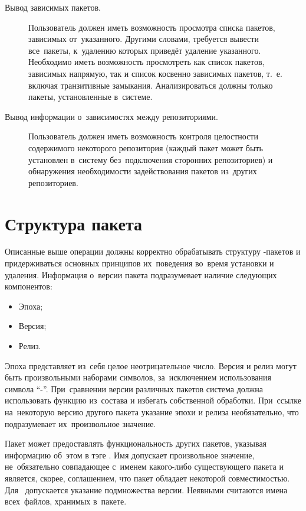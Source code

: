 \begin{description}
\item[Вывод зависимых пакетов.]
Пользователь должен иметь возможность просмотра списка пакетов, зависимых от~указанного.
Другими словами, требуется вывести все~пакеты, к~удалению которых приведёт удаление указанного.
Необходимо иметь возможность просмотреть как список пакетов, зависимых напрямую, 
так и список косвенно зависимых пакетов, т.~е. включая транзитивные замыкания.
Анализироваться должны только пакеты, установленные в~системе.

\item[Вывод информации о~зависимостях между репозиториями.]
Пользователь должен иметь возможность контроля 
целостности содержимого некоторого репозитория (каждый пакет может быть установлен в~систему без~подключения сторонних репозиториев)
и обнаружения необходимости   задействования пакетов из~других репозиториев. 

\end{description}

\section{Структура пакета}
\label{pkgstruct}

Описанные выше операции должны корректно обрабатывать структуру -пакетов и 
придерживаться основных принципов их~поведения во~время установки и удаления.
Информация о~версии пакета подразумевает наличие следующих компонентов:

\begin{itemize}
\item {Эпоха;}
\item{Версия;}
\item {Релиз.}
\end{itemize}

Эпоха представляет из~себя целое неотрицательное число. 
Версия и релиз могут быть произвольными наборами символов, за~исключением использования символа ``-''.
При~сравнении версии различных пакетов система должна использовать функцию  из~состава 
и избегать собственной обработки. 
При~ссылке на~некоторую версию другого пакета указание эпохи и релиза необязательно,
что подразумевает их~произвольное значение.

Пакет может предоставлять функциональность других пакетов,
указывая информацию об~этом в тэге .
Имя  допускает произвольное значение, не~обязательно совпадающее с~именем какого-либо существующего пакета
и является, скорее, соглашением, что пакет обладает некоторой совместимостью.
Для~  допускается указание подмножества версии.
Неявными  считаются имена всех~файлов, хранимых в~пакете.


